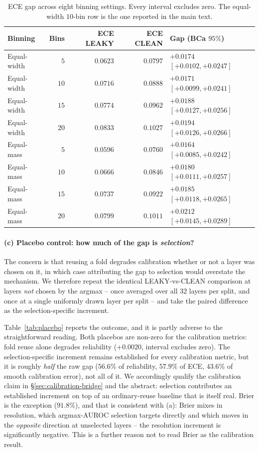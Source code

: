 \documentclass{article}
\begin{document}
\begin{table}[h]
\centering
\small
\begin{tabular}{@{}lrrrl@{}}
\toprule
Binning & Bins & ECE LEAKY & ECE CLEAN & Gap (BCa $95\%$) \\
\midrule
Equal-width & $5$  & $0.0623$ & $0.0797$ & $+0.0174$ $[+0.0102,+0.0247]$ \\
Equal-width & $10$ & $0.0716$ & $0.0888$ & $+0.0171$ $[+0.0099,+0.0241]$ \\
Equal-width & $15$ & $0.0774$ & $0.0962$ & $+0.0188$ $[+0.0127,+0.0256]$ \\
Equal-width & $20$ & $0.0833$ & $0.1027$ & $+0.0194$ $[+0.0126,+0.0266]$ \\
Equal-mass  & $5$  & $0.0596$ & $0.0760$ & $+0.0164$ $[+0.0085,+0.0242]$ \\
Equal-mass  & $10$ & $0.0666$ & $0.0846$ & $+0.0180$ $[+0.0111,+0.0257]$ \\
Equal-mass  & $15$ & $0.0737$ & $0.0922$ & $+0.0185$ $[+0.0118,+0.0265]$ \\
Equal-mass  & $20$ & $0.0799$ & $0.1011$ & $+0.0212$ $[+0.0145,+0.0289]$ \\
\bottomrule
\end{tabular}
\caption{ECE gap across eight binning settings. Every interval excludes zero.
The equal-width $10$-bin row is the one reported in the main text.}
\label{tab:ece-bins}
\end{table}

\paragraph{(c) Placebo control: how much of the gap is \emph{selection}?} The
concern is that reusing a fold degrades calibration whether or not a layer was
chosen on it, in which case attributing the gap to selection would overstate
the mechanism. We therefore repeat the identical LEAKY-vs-CLEAN comparison at
layers \emph{not} chosen by the argmax -- once averaged over all $32$ layers
per split, and once at a single uniformly drawn layer per split -- and take the
paired difference as the selection-specific increment.

Table~\ref{tab:placebo} reports the outcome, and it is partly adverse to the
straightforward reading. Both placebos are non-zero for the calibration
metrics: fold reuse alone degrades reliability ($+0.0020$, interval excludes
zero). The selection-specific increment remains established for every
calibration metric, but it is roughly \emph{half} the raw gap
($56.6\%$ of reliability, $57.9\%$ of ECE, $43.6\%$ of smooth calibration
error), not all of it. We accordingly qualify the calibration claim in
\S\ref{sec:calibration-bridge} and the abstract: selection contributes an
established increment on top of an ordinary-reuse baseline that is itself real.
Brier is the exception ($91.8\%$), and that is consistent with (a): Brier
mixes in resolution, which argmax-AUROC selection targets directly and which
moves in the \emph{opposite} direction at unselected layers -- the resolution
increment is significantly negative. This is a further reason not to read Brier
as the calibration result.
\end{document}
